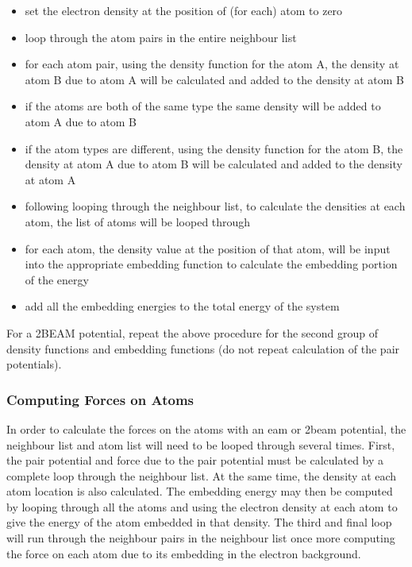\begin{itemize}
\item set the electron density at the position of (for each) atom to zero
\item loop through the atom pairs in the entire neighbour list
\item for each atom pair, using the density function for the atom A, the density at atom B due to atom A will be calculated and added to the density at atom B
\item if the atoms are both of the same type the same density will be added to atom A due to atom B
\item if the atom types are different, using the density function for the atom B, the density at atom A due to atom B will be calculated and added to the density at atom A
\item following looping through the neighbour list, to calculate the densities at each atom, the list of atoms will be looped through
\item for each atom, the density value at the position of that atom, will be input into the appropriate embedding function to calculate the embedding portion of the energy
\item add all the embedding energies to the total energy of the system
\end{itemize}

For a 2BEAM potential, repeat the above procedure for the second group of density functions and embedding functions (do not repeat calculation of the pair potentials).


\subsubsection{Computing Forces on Atoms}

In order to calculate the forces on the atoms with an \acrshort{eam} or \acrshort{2beam} potential, the neighbour list and atom list will need to be looped through several times.  First, the pair potential and force due to the pair potential must be calculated by a complete loop through the neighbour list.  At the same time, the density at each atom location is also calculated.  The embedding energy may then be computed by looping through all the atoms and using the electron density at each atom to give the energy of the atom embedded in that density.  The third and final loop will run through the neighbour pairs in the neighbour list once more computing the force on each atom due to its embedding in the electron background.

